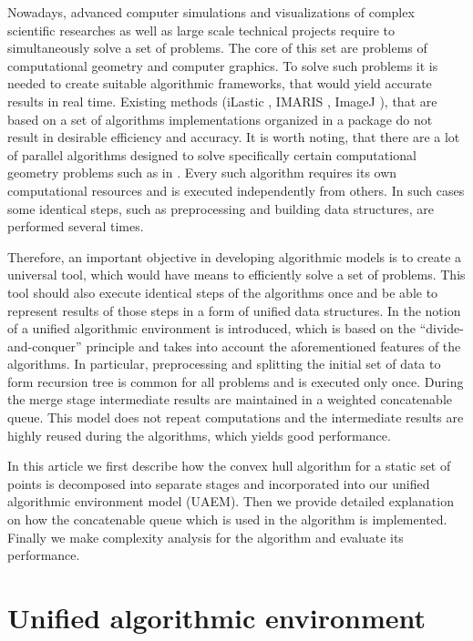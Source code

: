 \documentclass[twoside,twocolumn,10pt]{article}
\begin{document}
	Nowadays, advanced computer simulations and visualizations of complex scientific researches as well as large scale technical projects require to simultaneously solve a set of problems. The core of this set are problems of computational geometry and computer graphics. To solve such problems it is needed to create suitable algorithmic frameworks, that would yield accurate results in real time. Existing methods (iLastic \cite{ilastik}, IMARIS \cite{imaris}, ImageJ \cite{imagej}), that are based on a set of algorithms implementations organized in a package do not result in desirable efficiency and accuracy. It is worth noting, that there are a lot of parallel algorithms designed to solve specifically certain computational geometry problems such as in \cite{aggarwal,atallah,cole,amato,chen,berkman,goodman,akl,jaja,leeuwen,reif}. Every such algorithm requires its own computational resources and is executed independently from others. In such cases some identical steps, such as preprocessing and building data structures, are performed several times. 
	
	Therefore, an important objective in developing algorithmic models is to create a universal tool, which would have means to efficiently solve a set of problems. This tool should also execute identical steps of the algorithms once and be able to represent results of those steps in a form of unified data structures. In \cite{tereshchenko} the notion of a unified algorithmic environment is introduced, which is based on the ``divide-and-conquer'' principle and takes into account the aforementioned features of the algorithms. In particular, preprocessing and splitting the initial set of data to form recursion tree is common for all problems and is executed only once. During the merge stage intermediate results are maintained in a weighted concatenable queue. This model does not repeat computations and the intermediate results are highly reused during the algorithms, which yields good performance.
	
	In this article we first describe how the convex hull algorithm for a static set of points is decomposed into separate stages and incorporated into our unified algorithmic environment model (UAEM). Then we provide detailed explanation on how the concatenable queue which is used in the algorithm is implemented. Finally we make complexity analysis for the algorithm and evaluate its performance.

\section{Unified algorithmic environment}
\label{sec:unified-algorithmic-environment}
\end{document}
